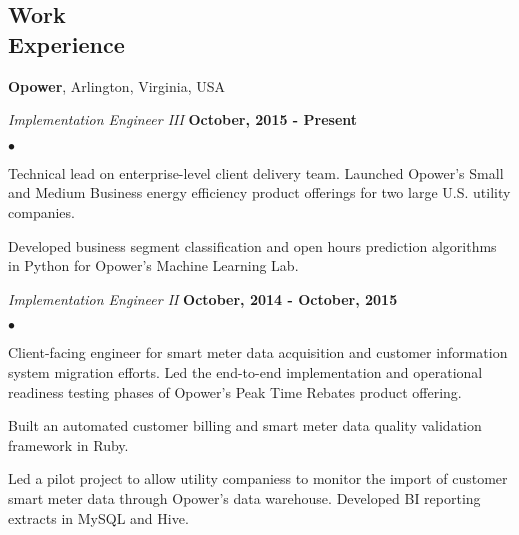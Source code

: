 \documentclass[margin,line]{res}
\newenvironment{list2}{
  \begin{list}{$\bullet$}{%
      \setlength{\itemsep}{0in}
      \setlength{\parsep}{0in} \setlength{\parskip}{0in}
      \setlength{\topsep}{0in} \setlength{\partopsep}{0in}
      \setlength{\leftmargin}{0.2in}}}{\end{list}}
\begin{document}
\begin{resume}
\section{\sc Work \\ Experience}

{\bf Opower}, Arlington, Virginia, USA

\vspace{-.3cm}
{\em Implementation Engineer III} \hfill {\bf October, 2015 - Present}\\

\vspace*{-5mm}
\vspace*{2mm}
\begin{list2}
\item Technical lead on enterprise-level client delivery team.
  Launched Opower's Small and Medium Business
  energy efficiency product offerings for two large U.S. utility
  companies.
\item Developed business segment classification and open hours
  prediction algorithms in Python for Opower's Machine Learning Lab.
\end{list2}
\vspace{-.3cm}
{\em Implementation Engineer II} \hfill {\bf October, 2014 - October, 2015}\\

\vspace*{-5mm}
\vspace*{2mm}
\begin{list2}
\item Client-facing engineer for smart meter data acquisition and
  customer information system migration efforts. Led the end-to-end
  implementation and operational readiness testing phases of Opower's
  Peak Time Rebates product offering.
\item Built an automated customer billing and smart meter data quality
  validation framework in Ruby.
\item Led a pilot project to allow utility companiess to monitor the
  import of customer smart meter data through Opower's data warehouse.
  Developed BI reporting extracts in MySQL and Hive.

\end{list2}


\end{resume}
\end{document}
